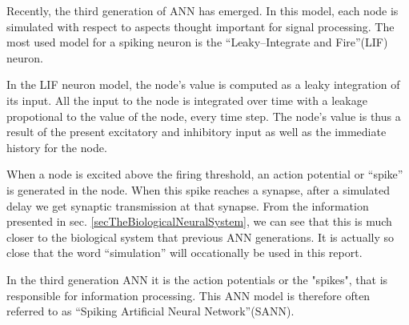 %
%

Recently, the third generation of ANN has emerged. In this model, each node is simulated with respect to aspects thought important for signal processing\cite{Maass97networksof}.
The most used model for a spiking neuron is the ``Leaky--Integrate and Fire''(LIF) neuron\cite{florian03}. 

In the LIF neuron model, the node's value is computed as a leaky integration of its input. 
All the input to the node is integrated over time with a leakage propotional to the value of the node, every time step.
The node's value is thus a result of the present excitatory and inhibitory input as well as the immediate history for the node.

When a node is excited above the firing threshold, an action potential or ``spike'' is generated in the node. 
When this spike reaches a synapse, after a simulated delay we get synaptic transmission at that synapse.
From the information presented in sec. \ref{secTheBiologicalNeuralSystem}, we can see that this is much closer to the biological system that previous ANN generations.
It is actually so close that the word ``simulation'' will occationally be used in this report.  	%

In the third generation ANN it is the action potentials or the "spikes", that is responsible for information processing.  %
This ANN model is therefore often referred to as ``Spiking Artificial Neural Network''(SANN).














